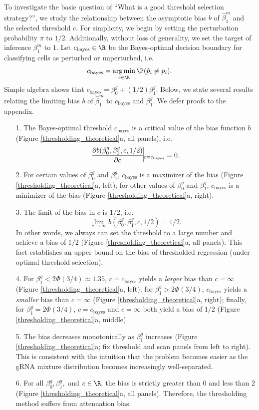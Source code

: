 \documentclass[12pt]{article}
\DeclareMathOperator*{\argmin}{arg\,min}
\begin{document}
To investigate the basic question of ``What is a good threshold selection strategy?'', we study the relationship between the asymptotic bias $b$ of $\hat{\beta}^m_1$ and the selected threshold $c$. For simplicity, we begin by setting the perturbation probability $\pi$ to $1/2$. Additionally, without loss of generality, we set the target of inference $\beta^m_1$ to $1$. Let $c_\textrm{bayes} \in \R$ be the Bayes-optimal decision boundary for classifying cells as perturbed or unperturbed, i.e. $$c_\textrm{bayes} = \argmin_{c \in \R} \P(\hat{p}_i \neq p_i).$$ Simple algebra shows that $c_\textrm{bayes} = \beta_0^g + (1/2) \beta^g_1.$ Below, we state several results relating the limiting bias $b$ of $\hat{\beta}^m_1$ to $c_\textrm{bayes}$ and $\beta^g_1$. We defer proofs to the appendix.

\begin{itemize}
\item[1.] The Bayes-optimal threshold $c_\textrm{bayes}$ is a critical value of the bias function $b$ (Figure \ref{thresholding_theoretical}a, all panels), i.e. 
$$ \frac{\partial b( \beta^g_0, \beta^g_1, c, 1/2)}{\partial c} \vline_{c = c_\textrm{bayes}} = 0.$$
\item[2.] For certain values of $\beta^g_0$ and $\beta^g_1$, $c_\textrm{bayes}$ is a maximizer of the bias (Figure \ref{thresholding_theoretical}a, left); for other values of $\beta^g_0$ and $\beta^g_1$, $c_\textrm{bayes}$ is a minimizer of the bias (Figure \ref{thresholding_theoretical}a, right).
\item[3.] The limit of the bias in $c$ is $1/2$, i.e. 
$$\lim_{c \to \infty} b(\beta^g_0, \beta^g_1, c, 1/2) = 1/2.$$ In other words, we always can set the threshold to a large number and achieve a bias of $1/2$ (Figure \ref{thresholding_theoretical}a, all panels). This fact establishes an upper bound on the bias of thresholded regression (under optimal threshold selection).
\item[4.] For $\beta^g_1 < 2 \Phi(3/4) \approx 1.35$, $c = c_\textrm{bayes}$ yields a \textit{larger} bias than $c = \infty$ (Figure \ref{thresholding_theoretical}a, left); for $\beta^g_1 > 2 \Phi(3/4)$, $c_\textrm{bayes}$ yields a \textit{smaller} bias than $c = \infty$ (Figure \ref{thresholding_theoretical}a, right); finally, for $\beta^g_1 = 2 \Phi(3/4)$, $c = c_\textrm{bayes}$ and $c = \infty$ both yield a bias of $1/2$ (Figure \ref{thresholding_theoretical}a, middle).
\item[5.] The bias decreases monotonically as $\beta_1^g$ increases (Figure \ref{thresholding_theoretical}a; fix threshold and scan panels from left to right). This is consistent with the intuition that the problem becomes easier as the gRNA mixture distribution becomes increasingly well-separated.
\item[6.] For all $\beta^g_0, \beta^g_1,$ and $c \in \R,$ the bias is strictly greater than $0$ and less than $2$ (Figure \ref{thresholding_theoretical}a, all panels). Therefore, the thresholding method suffers from attenuation bias.%
\end{itemize}
\end{document}
